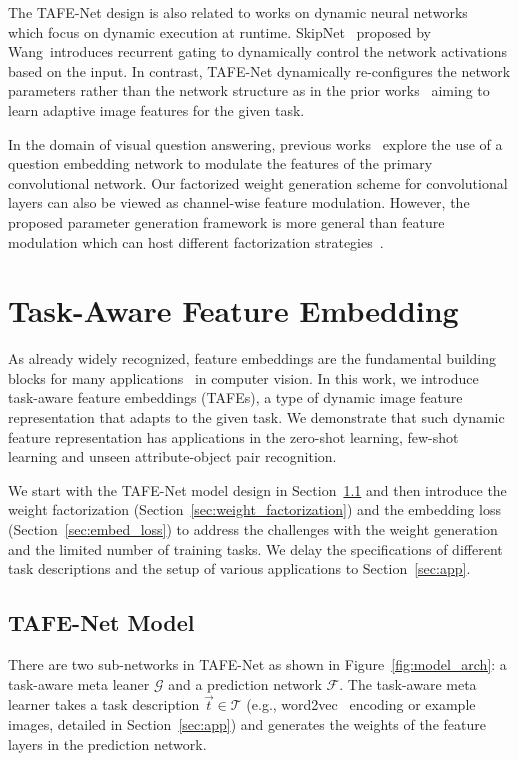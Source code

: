 \documentclass[10pt,twocolumn,letterpaper]{article}
\newcommand{\model}{TAFE-Net\xspace}
\begin{document}
The \model design is also related to works on dynamic neural networks~\cite{wang2018skipnet,wu2018blockdrop,wang2017idk,lin2017runtime} which focus on dynamic execution at runtime. SkipNet~\cite{wang2018skipnet} proposed by Wang~\etal introduces recurrent gating to dynamically control the network activations based on the input. In contrast, \model 
dynamically re-configures the network parameters rather than the network structure as in the prior works~\cite{wang2018skipnet,wu2018blockdrop} aiming to learn adaptive image features for the given task. 

In the domain of visual question answering, previous works~\cite{perez2018film, de2017modulating} explore the use of a question embedding network to modulate the features of the primary convolutional network. Our factorized weight
generation scheme for convolutional layers can also be viewed as channel-wise feature modulation. However, the proposed parameter generation framework is more general than feature modulation which can host different factorization strategies~\cite{bertinetto2016learning}.






 	\section{Task-Aware Feature Embedding}
As already widely recognized, feature embeddings are the fundamental building blocks for many applications~\cite{krizhevsky2012imagenet,long2015fully,girshick2015fast} in 
computer vision. In this work, we introduce task-aware feature embeddings (TAFEs), a type of dynamic image feature representation that adapts to the given task. We demonstrate that such dynamic feature representation has applications in the zero-shot learning, few-shot learning and unseen attribute-object pair recognition.

We start with the \model model design in Section~\ref{sec:model} and then introduce the weight factorization (Section~\ref{sec:weight_factorization}) and the embedding loss (Section~\ref{sec:embed_loss}) to address the
challenges with the weight generation and the limited number of training tasks. We delay the specifications of 
different task descriptions and the setup of various applications to Section~\ref{sec:app}. 

\subsection{\model Model}
\label{sec:model}
There are two sub-networks
in \model as shown in Figure~\ref{fig:model_arch}: a 
task-aware meta leaner $\mathcal{G}$ and a prediction network
$\mathcal{F}$. The task-aware meta learner takes a task description $\Vec{t}\in\mathcal{T}$ (e.g., word2vec~\cite{mikolov2013efficient} encoding or example images, detailed in Section~\ref{sec:app}) and generates the weights of the feature layers in the prediction network. 
\end{document}
